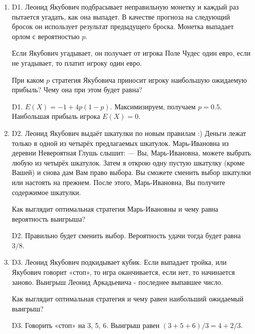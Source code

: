 \documentclass[12pt]{article}
\newenvironment{problem}{}{}
\newenvironment{sol}{}{} %
\begin{document}
\begin{enumerate}
\begin{problem}
\item[D1.] Леонид Якубович подбрасывает неправильную монетку и каждый раз пытается угадать, как она выпадет. В качестве прогноза на следующий бросок он использует результат предыдущего броска. Монетка выпадает орлом с вероятностью $p$.

Если Якубович угадывает, он получает от игрока Поле Чудес один евро, если не угадывает, то платит игроку один евро.

При каком $p$ стратегия Якубовича приносит игроку наибольшую ожидаемую прибыль? Чему она при этом будет равна?

\begin{sol}
D1. $E(X)=-1 + 4p(1-p)$. Максимизируем, получаем $p=0.5$. Наибольшая прибыль игрока $E(X)=0$.
\end{sol}
\end{problem}

\begin{problem}
\item[D2.] Леонид Якубович выдаёт шкатулки по новым правилам :) Деньги лежат только в одной из четырёх предлагаемых шкатулок. Марь-Ивановна из деревни Невероятная Глушь слышит:
— Вы, Марь-Ивановна, можете выбрать любую из четырёх шкатулок. Затем я открою одну пустую шкатулку (кроме Вашей) и снова дам Вам право выбора. Вы сможете сменить выбор шкатулки или настоять на прежнем. После этого, Марь-Ивановна, Вы получите содержимое шкатулки.

Как выглядит оптимальная стратегия Марь-Ивановны и чему равна вероятность выигрыша?

\begin{sol}
D2. Правильно будет сменить выбор. Вероятность удачи тогда будет равна $3/8$.
\end{sol}
\end{problem}

\begin{problem}
\item[D3.] Леонид Якубович подкидывает кубик. Если выпадает тройка, или Якубович говорит «стоп», то игра оканчивается, если нет, то начинается заново.
Выигрыш Леонид Аркадьевича - последнее выпавшее число. 

Как выглядит оптимальная стратегия и чему равен наибольший ожидаемый выигрыш?

\begin{sol}
D3. Говорить «стоп» на 3, 5, 6. Выигрыш равен $(3+5+6)/3=4+2/3$.
\end{sol}
\end{problem}



\end{enumerate}
\end{document}
